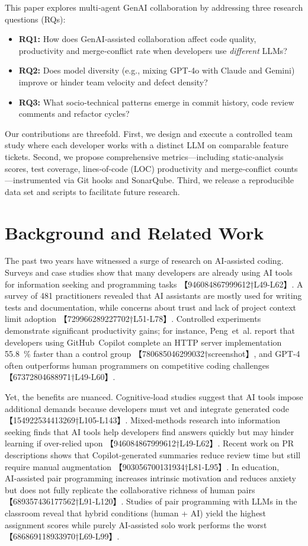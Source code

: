 \documentclass[conference]{IEEEtran}
\begin{document}
This paper explores multi‑agent GenAI collaboration by addressing three research questions (RQs):
\begin{itemize}
  \item \textbf{RQ1:} How does GenAI‑assisted collaboration affect code quality, productivity and merge‑conflict rate when developers use \emph{different} LLMs?
  \item \textbf{RQ2:} Does model diversity (e.g., mixing GPT‑4o with Claude and Gemini) improve or hinder team velocity and defect density?
  \item \textbf{RQ3:} What socio‑technical patterns emerge in commit history, code review comments and refactor cycles?
\end{itemize}

Our contributions are threefold.  First, we design and execute a controlled team study where each developer works with a distinct LLM on comparable feature tickets.  Second, we propose comprehensive metrics—including static‑analysis scores, test coverage, lines‑of‑code (LOC) productivity and merge‑conflict counts—instrumented via Git hooks and SonarQube.  Third, we release a reproducible data set and scripts to facilitate future research.

\section{Background and Related Work}
The past two years have witnessed a surge of research on AI‑assisted coding.  Surveys and case studies show that many developers are already using AI tools for information seeking and programming tasks 【946084867999612†L49-L62】.  A survey of 481 practitioners revealed that AI assistants are mostly used for writing tests and documentation, while concerns about trust and lack of project context limit adoption 【729966289227702†L51-L78】.  Controlled experiments demonstrate significant productivity gains; for instance, Peng et al. report that developers using GitHub Copilot complete an HTTP server implementation 55.8 \% faster than a control group 【780685046299032†screenshot】, and GPT‑4 often outperforms human programmers on competitive coding challenges 【67372804688971†L49-L60】.

Yet, the benefits are nuanced.  Cognitive‑load studies suggest that AI tools impose additional demands because developers must vet and integrate generated code 【154922534413269†L105-L143】.  Mixed‑methods research into information seeking finds that AI tools help developers find answers quickly but may hinder learning if over‑relied upon 【946084867999612†L49-L62】.  Recent work on PR descriptions shows that Copilot‑generated summaries reduce review time but still require manual augmentation 【903056700131934†L81-L95】.  In education, AI‑assisted pair programming increases intrinsic motivation and reduces anxiety but does not fully replicate the collaborative richness of human pairs 【689357436177562†L91-L120】.  Studies of pair programming with LLMs in the classroom reveal that hybrid conditions (human + AI) yield the highest assignment scores while purely AI‑assisted solo work performs the worst 【686869118933970†L69-L99】.
\end{document}
